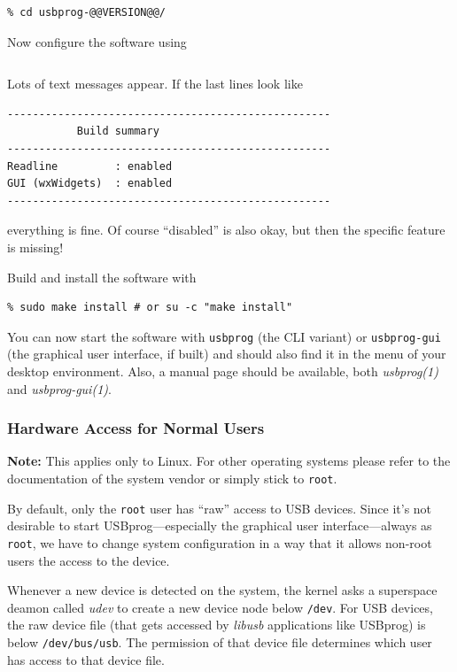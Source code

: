 \documentclass[bibtotoc,UKenglish,halfparskip,oneside,DIV12]{scrreprt}
\begin{document}
\begin{lstlisting}[style=inline]
% tar xvfj usbprog-@@VERSION@@.tar.bz2
% cd usbprog-@@VERSION@@/
\end{lstlisting}

Now configure the software using

\begin{lstlisting}[style=inline]
% ./configure
\end{lstlisting}

Lots of text messages appear. If the last lines look like

\begin{lstlisting}[style=inline]
---------------------------------------------------
           Build summary
---------------------------------------------------
Readline         : enabled
GUI (wxWidgets)  : enabled
---------------------------------------------------
\end{lstlisting}

everything is fine. Of course ``disabled'' is also okay, but then the specific feature is missing!

Build and install the software with

\begin{lstlisting}[style=inline]
% make
% sudo make install # or su -c "make install"
\end{lstlisting}

You can now start the software with \texttt{usbprog} (the CLI variant) or \texttt{usbprog-gui} (the
graphical user interface, if built) and should also find it in the menu of your desktop environment.
Also, a manual page should be available, both \emph{usbprog(1)} and \emph{usbprog-gui(1)}.

\subsubsection{Hardware Access for Normal Users}

\textbf{Note:} This applies only to Linux. For other operating systems please refer to the
documentation of the system vendor or simply stick to \texttt{root}.

By default, only the \texttt{root} user has ``raw'' access to USB devices. Since it's not desirable
to start USBprog---especially the graphical user interface---always as \texttt{root}, we have to
change system configuration in a way that it allows non-root users the access to the device.

Whenever a new device is detected on the system, the kernel asks a superspace deamon called
\emph{udev} to create a new device node below \texttt{/dev}. For USB devices, the raw device file
(that gets accessed by \emph{libusb} applications like USBprog) is below \texttt{/dev/bus/usb}. The
permission of that device file determines which user has access to that device file.
\end{document}
